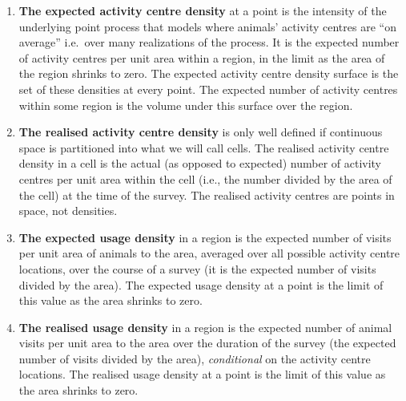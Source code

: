 \documentclass[10pt,a4paper]{article}
\begin{document}
\begin{enumerate}
\item \textbf{The expected activity centre density} at a point is the intensity of the underlying point process that models where animals' activity centres are ``on average''  i.e.\ over many realizations of the process. It is the expected number of activity centres per unit area within a region, in the limit as the area of the region shrinks to zero. The expected activity centre density surface is the set of these densities at every point. The expected number of activity centres within some region is the volume under this surface over the region.
\item \textbf{The realised activity centre density} is only well defined if continuous space is partitioned into what we will call cells. The realised activity centre density in a cell is the actual (as opposed to expected) number of activity centres per unit area within the cell (i.e., the number divided by the area of the cell) at the time of the survey. The realised activity centres are points in space, not densities.
\item \textbf{The expected usage density} in a region is the expected number of visits per unit area of animals to the area, averaged over all possible activity centre locations, over the course of a survey (it is the expected number of visits divided by the area). The expected usage density at a point is the limit of this value as the area shrinks to zero. 
\item \textbf{The realised usage density} in a region is the expected number of animal visits per unit area to the area over the duration of the survey (the expected number of visits divided by the area), \textit{conditional} on the activity centre locations. The realised usage density at a point is the limit of this value as the area shrinks to zero. 
\end{enumerate}
\end{document}
